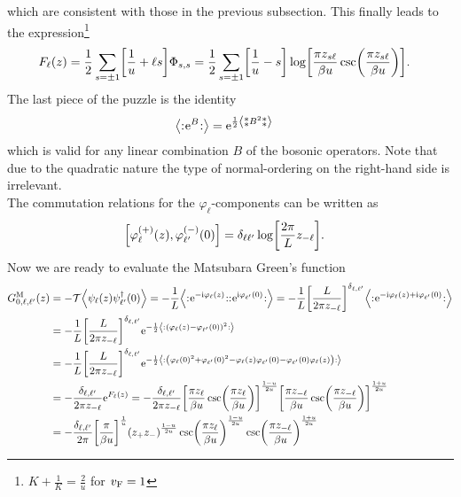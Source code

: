 \documentclass[english, parskip=full]{scrartcl}
\begin{document}
which are consistent with those in the previous subsection.
This finally leads to the expression\footnote{$K+\frac{1}{K} = \frac{2}{u}$ for $v_{\text{F}}=1$}
\begin{align}
F_\ell(z) &= \frac{1}{2} \sum_{s=\pm 1} \klb*{\frac{1}{u} + \ell s} \Phi_{s,s} = \frac{1}{2} \sum_{s=\pm 1} \klb*{\frac{1}{u} - s} \log\klb*{\frac{\pi z_{s\ell}}{\beta u} \csc\kla*{\frac{\pi z_{s\ell}}{\beta u}}}.
\end{align}
The last piece of the puzzle is the identity 
\begin{align}
\bra*{\normord{\powe{B}}} &= \powe{\frac{1}{2} \bra*{\varnormord{B^2}}}
\end{align}
which is valid for any linear combination $B$ of the bosonic operators.
Note that due to the quadratic nature the type of normal-ordering on the right-hand side is irrelevant.
\\
The commutation relations for the $\varphi_\ell$-components can be written as
\begin{align}
\klb*{\varphi_\ell^{(+)}(z), \varphi_{\ell'}^{(-)}(0)} &= \delta_{\ell\ell'}\log\klb*{\frac{2\pi}{L} z_{-\ell}}.
\end{align}
Now we are ready to evaluate the Matsubara Green's function
\begin{align}
G_{0,\ell,\ell'}^\M(z) &= -\mathcal{T}\bra*{\psi_\ell(z) \psi_{\ell'}^\dagger(0)} = -\frac{1}{L} \bra*{\normord{\powe{-\i\varphi_\ell(z)}} \normord{\powe{\i\varphi_{\ell'}(0)}}} = -\frac{1}{L} \klb*{\frac{L}{2\pi z_{-\ell}}}^{\delta_{\ell,\ell'}} \bra*{\normord{\powe{-\i\varphi_\ell(z) + \i\varphi_{\ell'}(0)}}}\\
&= -\frac{1}{L} \klb*{\frac{L}{2\pi z_{-\ell}}}^{\delta_{\ell,\ell'}} \powe{-\frac{1}{2} \bra*{\normord{ \kla*{\varphi_\ell(z) - \varphi_{\ell'}(0)}^2 }}} \\
&= -\frac{1}{L} \klb*{\frac{L}{2\pi z_{-\ell}}}^{\delta_{\ell,\ell'}} \powe{-\frac{1}{2} \bra*{\normord{\kla*{\varphi_\ell(0)^2 + \varphi_{\ell'}(0)^2 - \varphi_\ell(z) \varphi_{\ell'}(0) - \varphi_{\ell'}(0) \varphi_\ell(z)}}}}\\
&= -\frac{\delta_{\ell,\ell'}}{2\pi z_{-\ell}} \powe{F_\ell(z)} = -\frac{\delta_{\ell,\ell'}}{2\pi z_{-\ell}} \klb*{\frac{\pi z_\ell}{\beta u} \csc\kla*{\frac{\pi z_\ell}{\beta u}}}^{\frac{1-u}{2u}} \klb*{\frac{\pi z_{-\ell}}{\beta u} \csc\kla*{\frac{\pi z_{-\ell}}{\beta u}}}^{\frac{1+u}{2u}}\\
&= -\frac{\delta_{\ell,\ell'}}{2\pi} \klb*{\frac{\pi}{\beta u}}^\frac{1}{u} \kla*{z_+ z_-}^\frac{1-u}{2u} \csc\kla*{\frac{\pi z_\ell}{\beta u}}^{\frac{1-u}{2u}} \csc\kla*{\frac{\pi z_{-\ell}}{\beta u}}^{\frac{1+u}{2u}}
\end{align}
\end{document}

